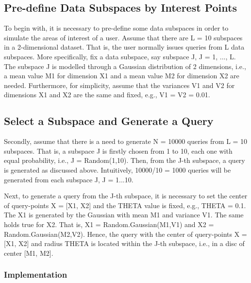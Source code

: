 \documentclass{lmproj}
\begin{document}
\subsection{Pre-define Data Subspaces by Interest Points}
To begin with, it is necessary to pre-define some data subspaces in order to simulate the areas of interest of a user. Assume that there are L = 10 subspaces in a 2-dimensional dataset. That is, the user normally issues queries from L data subspaces. More specifically, fix a data subspace, say subspace J, J = 1, ..., L. The subspace J is modelled through a Gaussian distribution of 2 dimensions, i.e., a mean value M1 for dimension X1 and a mean value M2 for dimension X2 are needed. Furthermore, for simplicity, assume that the variances V1 and V2 for dimensions X1 and X2 are the same and fixed, e.g., V1 = V2 = 0.01. 


\subsection{Select a Subspace and Generate a Query}
Secondly, assume that there is a need to generate N = 10000 queries from L = 10 subspaces. That is, a subspace J is firstly chosen from 1 to 10, each one with equal probability, i.e., J = Random(1,10). Then, from the J-th subspace, a query is generated as discussed above. Intuitively, 10000/10 = 1000 queries will be generated from each subspace J, J = 1...10. 

Next, to generate a query from the J-th subspace, it is necessary to set the center of query-points X = [X1, X2] and the THETA value is fixed, e.g., THETA = 0.1. The X1 is generated by the Gaussian with mean M1 and variance V1. The same holds true for X2. That is, X1 = Random.Gaussian(M1,V1) and X2 = Random.Gaussian(M2,V2). Hence, the query with the center of query-points X = [X1, X2] and radius THETA is located within the J-th subspace, i.e., in a disc of center [M1, M2].

\subsubsection{Implementation}
\end{document}
